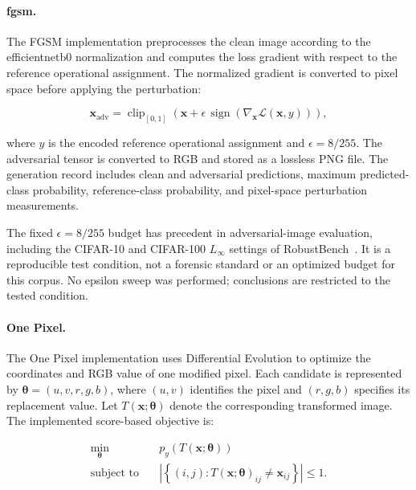 \paragraph{\gls{fgsm}.}

The FGSM implementation preprocesses the clean image according to the
\gls{efficientnetb0} normalization and computes the loss gradient with respect to
the reference operational assignment. The normalized gradient is converted to
pixel space before applying the perturbation:

\begin{equation}
\mathbf{x}_{\mathrm{adv}}
=
\operatorname{clip}_{[0,1]}
\left(
\mathbf{x}
+
\epsilon\,
\operatorname{sign}
\left(
\nabla_{\mathbf{x}}
\mathcal{L}(\mathbf{x},y)
\right)
\right),
\end{equation}

where \(y\) is the encoded reference operational assignment and
\(\epsilon = 8/255\). The adversarial tensor is converted to RGB and stored as
a lossless PNG file. The generation record includes clean and adversarial predictions, maximum
predicted-class probability, reference-class probability, and pixel-space
perturbation measurements.

The fixed \(\epsilon=8/255\) budget has precedent in adversarial-image
evaluation, including the CIFAR-10 and CIFAR-100 \(L_\infty\) settings of
RobustBench~\cite{croce2020robustbench}. It is a reproducible test condition,
not a forensic standard or an optimized budget for this corpus. No epsilon
sweep was performed; conclusions are restricted to the tested condition.

\paragraph{One Pixel.}

The One Pixel implementation uses Differential Evolution to optimize the
coordinates and RGB value of one modified pixel. Each candidate is represented
by
\(\boldsymbol{\theta}=(u,v,r,g,b)\), where \((u,v)\) identifies the pixel and
\((r,g,b)\) specifies its replacement value. Let
\(T(\mathbf{x};\boldsymbol{\theta})\) denote the corresponding transformed
image. The implemented score-based objective is:

\[
\begin{aligned}
\min_{\boldsymbol{\theta}}\quad &
p_y\!\left(T(\mathbf{x};\boldsymbol{\theta})\right)
\\
\text{subject to}\quad &
\left|
\left\{
(i,j):
T(\mathbf{x};\boldsymbol{\theta})_{ij}
\neq
\mathbf{x}_{ij}
\right\}
\right|
\leq 1.
\end{aligned}
\]

